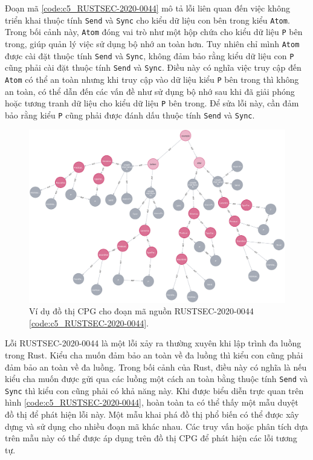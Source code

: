 Đoạn mã \ref{code:c5_RUSTSEC-2020-0044} mô tả lỗi liên quan đến việc không triển khai thuộc tính \texttt{Send} và \texttt{Sync} cho kiểu dữ liệu con bên trong kiểu \texttt{Atom}.
Trong bối cảnh này, \texttt{Atom} đóng vai trò như một hộp chứa cho kiểu dữ liệu \texttt{P} bên trong, giúp quản lý việc sử dụng bộ nhớ an toàn hơn.
Tuy nhiên chỉ mình \texttt{Atom} được cài đặt thuộc tính \texttt{Send} và \texttt{Sync}, không đảm bảo rằng kiểu dữ liệu con \texttt{P} cũng phải cài đặt thuộc tính \texttt{Send} và \texttt{Sync}.
Điều này có nghĩa việc truy cập đến \texttt{Atom} có thể an toàn nhưng khi truy cập vào dữ liệu kiểu \texttt{P} bên trong thì không an toàn, có thể dẫn đến các vấn đề như sử dụng bộ nhớ sau khi đã giải phóng hoặc tương tranh dữ liệu cho kiểu dữ liệu \texttt{P} bên trong.
Để sửa lỗi này, cần đảm bảo rằng kiểu \texttt{P} cũng phải được đánh dấu thuộc tính \texttt{Send} và \texttt{Sync}.

\begin{figure}[H]
    \includegraphics[width=1\columnwidth]{figures/c5/c5_RUSTSEC-2020-0044.png}
    \centering
    \caption{Ví dụ đồ thị CPG cho đoạn mã nguồn RUSTSEC-2020-0044 \ref{code:c5_RUSTSEC-2020-0044}.}
    \label{img:c5_RUSTSEC-2020-0044}
\end{figure}

Lỗi RUSTSEC-2020-0044 là một lỗi xảy ra thường xuyên khi lập trình đa luồng trong Rust.
Kiểu cha muốn đảm bảo an toàn về đa luồng thì kiểu con cũng phải đảm bảo an toàn về đa luồng.
Trong bối cảnh của Rust, điều này có nghĩa là nếu kiểu cha muốn được gửi qua các luồng một cách an toàn bằng thuộc tính \texttt{Send} và \texttt{Sync} thì kiểu con cũng phải có khả năng này.
Khi được biểu diễn trực quan trên hình \ref{code:c5_RUSTSEC-2020-0044}, hoàn toàn ta có thể thấy một mẫu duyệt đồ thị để phát hiện lỗi này.
Một mẫu khai phá đồ thị phổ biến có thể được xây dựng và sử dụng cho nhiều đoạn mã khác nhau.
Các truy vấn hoặc phân tích dựa trên mẫu này có thể được áp dụng trên đồ thị CPG để phát hiện các lỗi tương tự.

